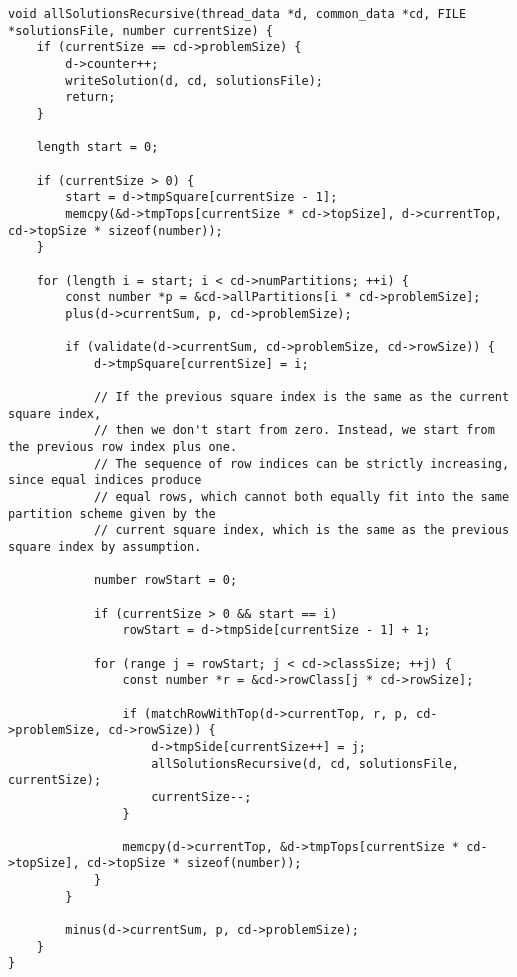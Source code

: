 \begin{lstlisting}[caption={},label={allSolutionsRecursive}]
void allSolutionsRecursive(thread_data *d, common_data *cd, FILE *solutionsFile, number currentSize) {
    if (currentSize == cd->problemSize) {
        d->counter++;
        writeSolution(d, cd, solutionsFile);
        return;
    }

    length start = 0;

    if (currentSize > 0) {
        start = d->tmpSquare[currentSize - 1];
        memcpy(&d->tmpTops[currentSize * cd->topSize], d->currentTop, cd->topSize * sizeof(number));
    }

    for (length i = start; i < cd->numPartitions; ++i) {
        const number *p = &cd->allPartitions[i * cd->problemSize];
        plus(d->currentSum, p, cd->problemSize);

        if (validate(d->currentSum, cd->problemSize, cd->rowSize)) {
            d->tmpSquare[currentSize] = i;

            // If the previous square index is the same as the current square index,
            // then we don't start from zero. Instead, we start from the previous row index plus one.
            // The sequence of row indices can be strictly increasing, since equal indices produce
            // equal rows, which cannot both equally fit into the same partition scheme given by the
            // current square index, which is the same as the previous square index by assumption.

            number rowStart = 0;

            if (currentSize > 0 && start == i)
                rowStart = d->tmpSide[currentSize - 1] + 1;

            for (range j = rowStart; j < cd->classSize; ++j) {
                const number *r = &cd->rowClass[j * cd->rowSize];

                if (matchRowWithTop(d->currentTop, r, p, cd->problemSize, cd->rowSize)) {
                    d->tmpSide[currentSize++] = j;
                    allSolutionsRecursive(d, cd, solutionsFile, currentSize);
                    currentSize--;
                }

                memcpy(d->currentTop, &d->tmpTops[currentSize * cd->topSize], cd->topSize * sizeof(number));
            }
        }

        minus(d->currentSum, p, cd->problemSize);
    }
}
\end{lstlisting}

